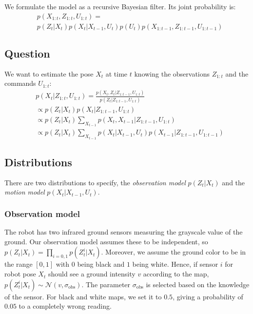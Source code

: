 \documentclass[letterpaper, 10pt, conference]{ieeeconf}
\begin{document}
We formulate the model as a recursive Bayesian filter.
Its joint probability is:
\begin{equation}
\begin{split}
& p(X_{1:t}, Z_{1:t}, U_{1:t}) = \\
& p(Z_t|X_t) p(X_t|X_{t-1}, U_{t}) p(U_t) p(X_{1:t-1}, Z_{1:t-1}, U_{1:t-1})
\end{split}
\end{equation}

\subsection{Question}

We want to estimate the pose $X_t$ at time $t$ knowing the observations $Z_{1:t}$ and the commands $U_{1:t}$:
\begin{equation}
\begin{split}
& p(X_t|Z_{1:t},U_{1:t}) = \frac{p(X_t,Z_t | Z_{1:t-1}, U_{1:t})}{p(Z_t|Z_{1:t-1}, U_{1:t})} \\
 &\propto p(Z_t | X_t) p(X_t | Z_{1:t-1}, U_{1:t}) \\
 &\propto p(Z_t | X_t) \sum_{X_{t-1}} p(X_t, X_{t-1} | Z_{1:t-1}, U_{1:t} ) \\
 &\propto p(Z_t | X_t) \sum_{X_{t-1}} p(X_t|X_{t-1}, U_t) p(X_{t-1} | Z_{1:t-1}, U_{1:t-1})
\end{split}
\end{equation}

\subsection{Distributions}

There are two distributions to specify, the \emph{observation model} $p(Z_t | X_t)$ and the \emph{motion model} $p(X_t|X_{t-1}, U_t)$.

\subsubsection{Observation model}

The robot has two infrared ground sensors measuring the grayscale value of the ground.
Our observation model assumes these to be independent, so $p(Z_t | X_t) = \prod_{i=0,1} p(Z_t^{i} | X_t)$.
Moreover, we assume the ground color to be in the range $[0,1]$ with $0$ being black and $1$ being white.
Hence, if sensor $i$ for robot pose $X_t$ should see a ground intensity $v$ according to the map, $p(Z_t^{i} | X_t) \sim \mathcal{N}(v,\sigma_\mathrm{obs})$.
The parameter $\sigma_\mathrm{obs}$ is selected based on the knowledge of the sensor.
For black and white maps, we set it to $0.5$, giving a probability of $0.05$ to a completely wrong reading.
\end{document}
